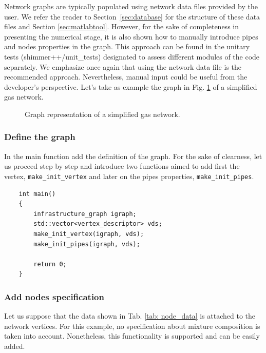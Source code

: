     

Network graphs are typically populated using network data files provided by the user. We refer the reader to Section~\ref{sec:database} for the structure of these data files and Section \ref{sec:matlabtool}. However, for the sake of completeness in presenting the numerical stage, it is also shown how to manually introduce pipes and nodes properties in the graph. This approach can be found in the unitary tests (shimmer++/unit\_tests) designated to assess different modules of the code separately. We emphasize once again that using the network data file is the recommended approach. Nevertheless, manual input could be useful from the developer's perspective.  Let's take as example the graph in Fig. \ref{fig: graph_example} of a simplified  gas network. 

\begin{figure}[H]
    \centering
                
    \caption{Graph representation of a simplified gas network.}
    \label{fig: graph_example}
\end{figure}

\subsubsection{Define the graph}
In the main function add the definition of the graph. For the sake of clearness, let us proceed step by step and introduce two functions aimed to add first the vertex, \texttt{make\_init\_vertex} and later on the pipes properties, \texttt{make\_init\_pipes}. 
\begin{verbatim}
    int main()
    {
        infrastructure_graph igraph;
        std::vector<vertex_descriptor> vds;
        make_init_vertex(igraph, vds);
        make_init_pipes(igraph, vds);
    
        return 0; 
    }
\end{verbatim}   

\subsubsection{Add nodes specification}
Let us suppose that the data shown in Tab. \ref{tab: node_data} is attached to the network vertices. For this example, no specification about mixture composition is  taken into account. Nonetheless, this functionality is supported and can be easily added.

